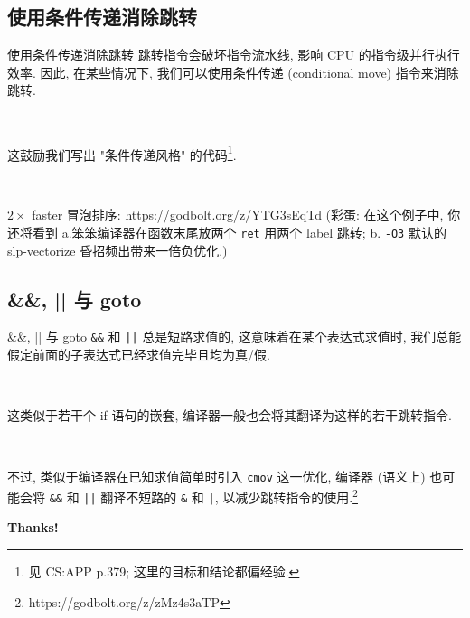 \documentclass{ctexbeamer}
\begin{document}
\subsection*{使用条件传递消除跳转}

\begin{frame}{使用条件传递消除跳转}
  \qquad 跳转指令会破坏指令流水线, 影响 CPU 的指令级并行执行效率. 因此, 在某些情况下, 我们可以使用条件传递 (conditional move) 指令来消除跳转.

  \,

  \pause
  \qquad 这鼓励我们写出 "条件传递风格" 的代码\footnote{见 CS:APP p.379; 这里的目标和结论都偏经验.}.

  \,

  \pause
  \qquad $2\times$ faster 冒泡排序: https://godbolt.org/z/YTG3sEqTd (彩蛋: 在这个例子中, 你还将看到 a.笨笨编译器在函数末尾放两个 \texttt{ret} 用两个 label 跳转; b. \texttt{-O3} 默认的 slp-vectorize 昏招频出带来一倍负优化.)
\end{frame}

\subsection*{\&\&, || 与 goto}

\begin{frame}{\&\&, || 与 goto}
  \qquad \texttt{\&\&} 和 \texttt{||} 总是短路求值的, 这意味着在某个表达式求值时, 我们总能假定前面的子表达式已经求值完毕且均为真/假.

  \,

  \pause
  \qquad 这类似于若干个 if 语句的嵌套, 编译器一般也会将其翻译为这样的若干跳转指令.

  \,

  \pause
  \qquad 不过, 类似于编译器在已知求值简单时引入 \texttt{cmov} 这一优化, 编译器 (语义上) 也可能会将 \texttt{\&\&} 和 \texttt{||} 翻译不短路的 \texttt{\&} 和 \texttt{|}, 以减少跳转指令的使用.\footnote{https://godbolt.org/z/zMz4s3aTP}
\end{frame}

\begin{frame}[plain]
  \begin{center}
    \Huge\color{tyblue}\bfseries Thanks!
  \end{center}
\end{frame}
\end{document}
